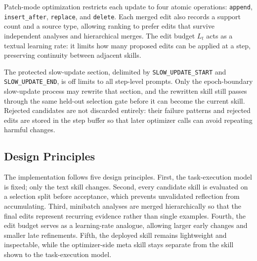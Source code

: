 \documentclass{llmxive}
\begin{document}
Patch-mode optimization restricts each update to four atomic operations: \texttt{append}, \texttt{insert\_after}, \texttt{replace}, and \texttt{delete}. Each merged edit also records a support count and a source type, allowing ranking to prefer edits that survive independent analyses and hierarchical merges. The edit budget $L_t$ acts as a textual learning rate: it limits how many proposed edits can be applied at a step, preserving continuity between adjacent skills.

The protected slow-update section, delimited by \texttt{SLOW\_UPDATE\_START} and \texttt{SLOW\_UPDATE\_END}, is off limits to all step-level prompts. Only the epoch-boundary slow-update process may rewrite that section, and the rewritten skill still passes through the same held-out selection gate before it can become the current skill. Rejected candidates are not discarded entirely: their failure patterns and rejected edits are stored in the step buffer so that later optimizer calls can avoid repeating harmful changes.

\subsection{Design Principles}
\label{app:design_principles}

The implementation follows five design principles. First, the task-execution model is fixed; only the text skill changes. Second, every candidate skill is evaluated on a selection split before acceptance, which prevents unvalidated reflection from accumulating. Third, minibatch analyses are merged hierarchically so that the final edits represent recurring evidence rather than single examples. Fourth, the edit budget serves as a learning-rate analogue, allowing larger early changes and smaller late refinements. Fifth, the deployed skill remains lightweight and inspectable, while the optimizer-side meta skill stays separate from the skill shown to the task-execution model.
\end{document}
